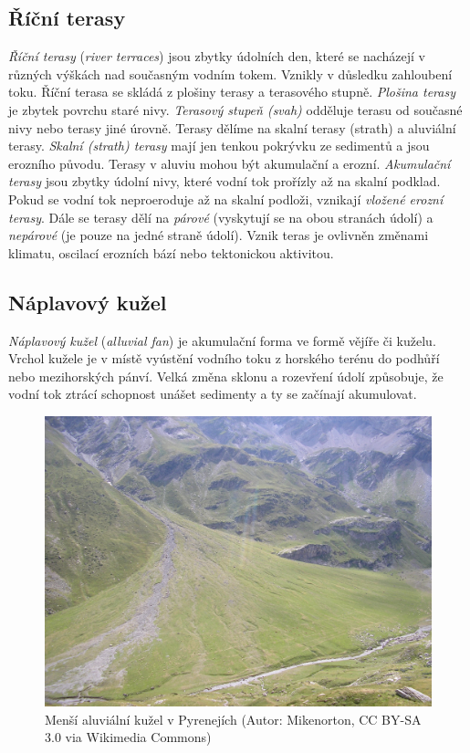 \subsection{Říční terasy}
\emph{Říční terasy} (\textit{river terraces}) jsou zbytky údolních den, které se nacházejí v různých výškách nad současným vodním tokem. Vznikly v důsledku zahloubení toku. Říční terasa se skládá z plošiny terasy a terasového stupně. \emph{Plošina terasy} je zbytek povrchu staré nivy. \emph{Terasový stupeň (svah)} odděluje terasu od současné nivy nebo terasy jiné úrovně. Terasy dělíme na skalní terasy (strath) a aluviální terasy. \emph{Skalní (strath) terasy} mají jen tenkou pokrývku ze sedimentů a jsou erozního původu. Terasy v aluviu mohou být akumulační a erozní. \emph{Akumulační terasy} jsou zbytky údolní nivy, které vodní tok prořízly až na skalní podklad. Pokud se vodní tok neproeroduje až na skalní podloži, vznikají \emph{vložené erozní terasy}. Dále se terasy dělí na \emph{párové} (vyskytují se na obou stranách údolí) a \emph{nepárové} (je pouze na jedné straně údolí). Vznik teras je ovlivněn změnami klimatu, oscilací erozních bází nebo tektonickou aktivitou. 

\subsection{Náplavový kužel}
\emph{Náplavový kužel} (\textit{alluvial fan}) je akumulační forma ve formě vějíře či kuželu. Vrchol kužele je v místě vyústění vodního toku z horského terénu do podhůří nebo mezihorských pánví. Velká změna sklonu a rozevření údolí způsobuje, že vodní tok ztrácí schopnost unášet sedimenty a ty se začínají akumulovat. 

\begin{figure}[h]
	\centering
	\includegraphics[width=1\linewidth]{obrazky/fluvial/Alluvial_fan}
	\caption{Menší aluviální kužel v Pyrenejích (Autor: Mikenorton, CC BY-SA 3.0 via Wikimedia Commons)}
	\label{fig:alluvialfan}
\end{figure}

